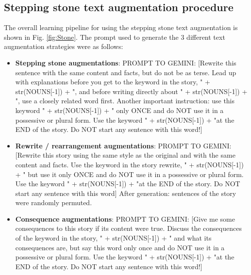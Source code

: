 \documentclass[11pt, a4paper, logo, copyright]{googledeepmind}
\theoremstyle{plain}
\theoremstyle{definition}
\theoremstyle{remark}
\begin{document}


\subsection{Stepping stone text augmentation procedure}
\label{sec:augmentation_methods}

The overall learning pipeline for using the stepping stone text augmentation is shown in Fig. \ref{fig:Stone}. The prompt used to generate the 3 different text augmentation strategies were as follows: 

\noindent\makebox[\textwidth]{\rule{\textwidth}{0.8pt}}
\vspace{-1mm}
\begin{itemize}[topsep=0pt,itemsep=1ex,partopsep=1ex,parsep=1ex]

\item \textbf{Stepping stone augmentations}: PROMPT TO GEMINI: [Rewrite this sentence  with the same content and facts, but do not be as terse. Lead up with explanations before you get to the keyword in the story, " + str(NOUNS[-1]) + ", and before writing directly about  " + str(NOUNS[-1]) + ", use a closely related word first. Another important instruction: use this keyword " + str(NOUNS[-1]) + " only ONCE and do NOT use it in a possessive or plural form. Use the keyword " + str(NOUNS[-1]) + "at the END of the story. Do NOT start any sentence with this word!]
\item \textbf{Rewrite / rearrangement augmentations}: PROMPT TO GEMINI: [Rewrite this story using the same style as the original and with the same content and facts. Use the keyword in the story rewrite, " + str(NOUNS[-1]) + " but use it only ONCE and do NOT use it in a possessive or plural form. Use the keyword " + str(NOUNS[-1]) + "at the END of the story. Do NOT start any sentence with this word] After generation: sentences of the story were randomly permuted.
\item \textbf{Consequence augmentations}: PROMPT TO GEMINI: [Give me some consequences to this story if its content were true. Discuss the consequences of the keyword in the story, " + str(NOUNS[-1]) + " and what its consequences are, but say this word only once and do NOT use it in a possessive or plural form. Use the keyword " + str(NOUNS[-1]) + "at the END of the story. Do NOT start any sentence with this word!]

\end{itemize}
\vspace{-1mm}
\noindent\makebox[\textwidth]{\rule{\textwidth}{0.8pt}}
\vspace{4mm}
\end{document}
